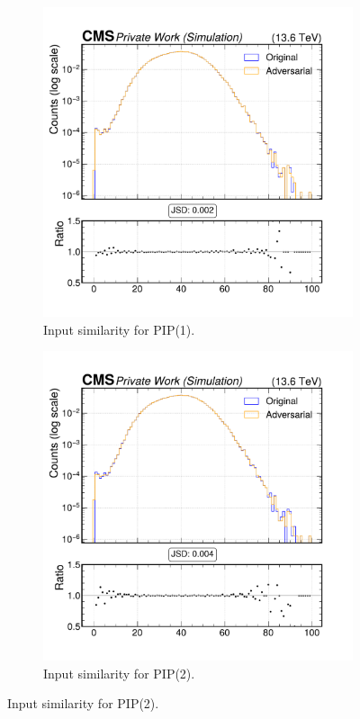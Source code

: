 \begin{figure}[htbp]
  \centering
  \begin{subfigure}[t]{0.5\textwidth}
    \includegraphics[width=\linewidth]{media/output/features/compare/intprob_1/cmp_global_features_npv.pdf}
    \caption{Input similarity for PIP(1).}
    \label{fig:left}
  \end{subfigure}\hfill
  \begin{subfigure}[t]{0.5\textwidth}
    \includegraphics[width=\linewidth]{media/output/features/compare/intprob_2/cmp_global_features_npv.pdf}
    \caption{Input similarity for PIP(2).}
  \end{subfigure}\hfill


\end{figure}
